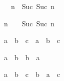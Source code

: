 \begin{isabellebody}
\begin{isamarkuptext}
\begin{isabelle}%
{}\ {\isacharplus}\ n\ {\isacharequal}\ Suc\ {\isacharparenleft}Suc\ n{\isacharparenright}%
\end{isabelle}

\begin{isabelle}%
n\ {\isacharplus}\ {}\ {\isacharequal}\ Suc\ {\isacharparenleft}Suc\ n{\isacharparenright}%
\end{isabelle}

\begin{isabelle}%
a\ {\isacharplus}\ b\ {\isacharplus}\ c\ {\isacharequal}\ a\ {\isacharplus}\ {\isacharparenleft}b\ {\isacharplus}\ c{\isacharparenright}%
\end{isabelle}

\begin{isabelle}%
a\ {\isacharplus}\ b\ {\isacharequal}\ b\ {\isacharplus}\ a%
\end{isabelle}

\begin{isabelle}%
a\ {\isacharplus}\ {\isacharparenleft}b\ {\isacharplus}\ c{\isacharparenright}\ {\isacharequal}\ b\ {\isacharplus}\ {\isacharparenleft}a\ {\isacharplus}\ c{\isacharparenright}%
\end{isabelle}


\end{isamarkuptext}
\end{isabellebody}
